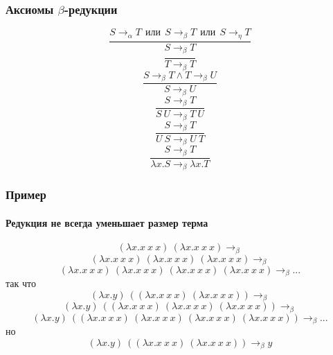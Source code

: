 \documentclass[xetex,mathserif,serif]{beamer}
\begin{document}
	\begin{frame}
		\frametitle{Аксиомы $\beta$-редукции}
		$$\dfrac{S \rightarrow_\alpha T\ \ 
			\mbox{или}\ \ S \rightarrow_\beta T\ \ 
			\mbox{или}\ \  S \rightarrow_\eta T}{S \rightarrow_\beta T}$$ 
		$$\dfrac{}{T \rightarrow_\beta T}$$
		$$\dfrac{S \rightarrow_\beta T \wedge T \rightarrow_\beta U}{S \rightarrow_\beta U}$$
		$$\dfrac{S \rightarrow_\beta T}{S\ U \rightarrow_\beta T\ U}$$
		$$\dfrac{S \rightarrow_\beta T}{U\ S \rightarrow_\beta U\ T}$$
		$$\dfrac{S \rightarrow_\beta T}{\lambda x.S \rightarrow_\beta \lambda x.T}$$
	\end{frame}

	\begin{frame}
		\frametitle{Пример}
		\framesubtitle{Редукция не всегда уменьшает размер терма}
		$$(\lambda x.x\ x\ x)\ (\lambda x.x\ x\ x) \rightarrow_\beta$$ 
		$$(\lambda x.x\ x\ x)\ (\lambda x.x\ x\ x)\ (\lambda x.x\ x\ x) \rightarrow_\beta$$
		$$(\lambda x.x\ x\ x)\ (\lambda x.x\ x\ x)\ (\lambda x.x\ x\ x)\ (\lambda x.x\ x\ x) \rightarrow_\beta ...$$
		так что 
		$$(\lambda x.y)\ ((\lambda x.x\ x\ x)\ (\lambda x.x\ x\ x)) \rightarrow_\beta$$ 
		$$(\lambda x.y)\ ((\lambda x.x\ x\ x)\ (\lambda x.x\ x\ x)\ (\lambda x.x\ x\ x)) \rightarrow_\beta$$
		$$(\lambda x.y)\ ((\lambda x.x\ x\ x)\ (\lambda x.x\ x\ x)\ (\lambda x.x\ x\ x)\ (\lambda x.x\ x\ x)) \rightarrow_\beta ...$$
		но
		$$(\lambda x.y)\ ((\lambda x.x\ x\ x)\ (\lambda x.x\ x\ x)) \rightarrow_\beta y$$		
	\end{frame}
\end{document}
